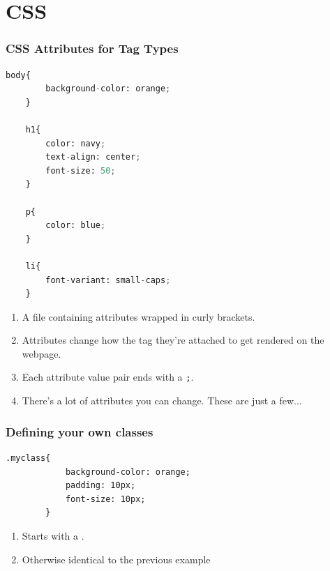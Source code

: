 \documentclass{beamer}
\begin{document}
\section{CSS}
%
%
\begin{frame}[fragile]
    \frametitle{CSS Attributes for Tag Types}
    \begin{minipage}{0.44\textwidth}
        \begin{lstlisting}[language=python, basicstyle=\scriptsize, autogobble]
    body{
        background-color: orange;
    }

    h1{
        color: navy;
        text-align: center;
        font-size: 50;
    }

    p{
        color: blue;
    }

    li{
        font-variant: small-caps;
    }
        \end{lstlisting} 
    \end{minipage}
    \hfill
    \begin{minipage}{0.44\textwidth}
        {\footnotesize
        \begin{enumerate}[A]
            \item A file containing attributes wrapped in curly brackets.
            \item Attributes change how the tag they're attached to get rendered on the webpage.
            \item Each attribute value pair ends with a \lstinline|;|.
            \item There's a lot of attributes you can change. These are just a few...
        \end{enumerate}}
    \end{minipage}
\end{frame}

%
%
\begin{frame}[fragile]
    \frametitle{Defining your own classes}
    \begin{minipage}{0.44\textwidth}
        \begin{lstlisting}[basicstyle=\scriptsize, autogobble]
        .myclass{
            background-color: orange;
            padding: 10px;
            font-size: 10px;
        }
        \end{lstlisting} 
    \end{minipage}
    \hfill
    \begin{minipage}{0.44\textwidth}
        \begin{enumerate}[A]
            \item Starts with a .
            \item Otherwise identical to the previous example
        \end{enumerate}
    \end{minipage}
\end{frame}
\end{document}
